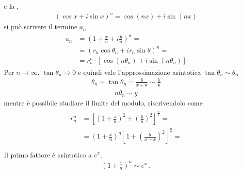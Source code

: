 \documentclass[letterpaper,10pt,italian]{jupyterBook}
\begin{document}
\sphinxAtStartPar
e la {\hyperref[\detokenize{ch/algebra/complex-algebra-notes:math-hs-algebra-complex-notes-demoivre}]{}},
\begin{equation*}
\begin{split}( \cos x + i \sin x)^n = \cos( n x ) + i \sin ( n x )\end{split}
\end{equation*}
\sphinxAtStartPar
si può scrivere il termine \(a_n\)
\begin{equation*}
\begin{split}\begin{aligned}
  a_n & = \left( 1 + \frac{x}{n} + i \frac{y}{n} \right)^n = \\
      & = \left( r_n \cos \theta_n + i r_n \sin \theta \right)^n = \\
      & = r_n^n \cdot \left[ \cos ( n \theta_n ) + i \sin (n \theta_n) \right]
\end{aligned}\end{split}
\end{equation*}
\sphinxAtStartPar
Per \(n \rightarrow \infty\), \(\tan \theta_n \rightarrow 0\) e quindi vale l’approssimazione asintotica \(\tan \theta_n \sim \theta_n\)
\begin{equation*}
\begin{split}\theta_n \sim \tan \theta_n = \frac{y}{x+n} \sim \frac{y}{n}\end{split}
\end{equation*}\begin{equation*}
\begin{split}n \theta_n \sim y\end{split}
\end{equation*}
\sphinxAtStartPar
mentre è possibile studiare il limite del modulo, riscrivendolo come
\begin{equation*}
\begin{split}\begin{aligned}
  r_n^n & = \left[ \left( 1 + \frac{x}{n} \right)^2 + \left( \frac{y}{n} \right)^2 \right]^{\frac{n}{2}} = \\
        & = \left( 1 + \frac{x}{n} \right)^{n} \left[ 1 + \left(\frac{y}{n+x}\right)^2 \right]^{\frac{n}{2}} = \\
\end{aligned}\end{split}
\end{equation*}
\sphinxAtStartPar
Il primo fattore è asintotico a \(e^x\),
\begin{equation*}
\begin{split}\left( 1 + \frac{x}{n} \right)^n \sim e^x \ .\end{split}
\end{equation*}
\end{document}

